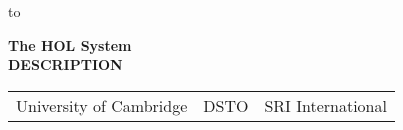 

\begin{titlepage}
\null\vskip-47pt
\hbox to 

\setcounter{page}{1}		          %

\vspace*{60mm}


\begin{center}
 {\Huge\bf The HOL System}\\[0.4cm]
{\LARGE\bf DESCRIPTION}\\[2.5cm]
\end{center}

\vspace*{100mm}
\begin{center}
\begin{tabular}{ccc}
University of Cambridge & \hspace*{10ex}DSTO\hspace*{10ex} & SRI International
\end{tabular}
\end{center}

\vfill
\end{titlepage}

\thispagestyle{empty}
\mbox{}
\newpage
